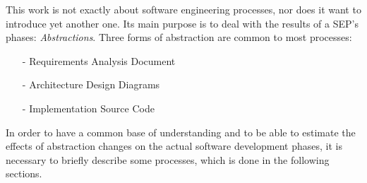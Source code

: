 This work is not exactly about software engineering processes, nor does it want
to introduce yet another one. Its main purpose is to deal with the results of a
SEP's phases: \emph{Abstractions}. Three forms of abstraction are common to most
processes:

\begin{itemize}
    \item[-] Requirements Analysis Document
    \item[-] Architecture Design Diagrams
    \item[-] Implementation Source Code
\end{itemize}

In order to have a common base of understanding and to be able to estimate the
effects of abstraction changes on the actual software development phases, it is
necessary to briefly describe some processes, which is done in the following
sections.








